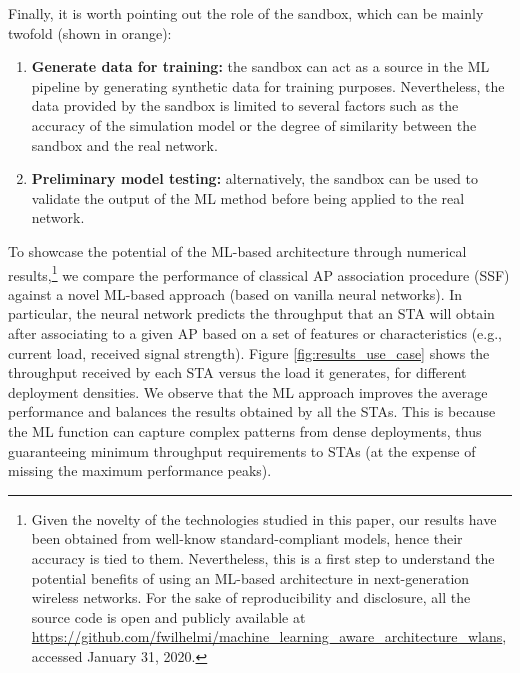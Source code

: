 \documentclass[journal]{IEEEtran}
\begin{document}
Finally, it is worth pointing out the role of the sandbox, which can be mainly twofold (shown in orange):
\begin{enumerate}
	\item \textbf{Generate data for training:} the sandbox can act as a source in the ML pipeline by generating synthetic data for training purposes. Nevertheless, the data provided by the sandbox is limited to several factors such as the accuracy of the simulation model or the degree of similarity between the sandbox and the real network. %
	\item \textbf{Preliminary model testing:} alternatively, the sandbox can be used to validate the output of the ML method before being applied to the real network.
\end{enumerate}

To showcase the potential of the ML-based architecture through numerical results,\footnote{Given the novelty of the technologies studied in this paper, our results have been obtained from well-know standard-compliant models, hence their accuracy is tied to them. Nevertheless, this is a first step to understand the potential benefits of using an ML-based architecture in next-generation wireless networks. For the sake of reproducibility and disclosure, all the source code is open and publicly available at \href{https://github.com/fwilhelmi/machine_learning_aware_architecture_wlans}{https://github.com/fwilhelmi/machine\_learning\_aware\_architecture\_wlans}, accessed January 31, 2020.} we compare the performance of classical AP association procedure (SSF) against a novel ML-based approach (based on vanilla neural networks). In particular, the neural network predicts the throughput that an STA will obtain after associating to a given AP based on a set of features or characteristics (e.g., current load, received signal strength). Figure \ref{fig:results_use_case} shows the throughput received by each STA versus the load it generates, for different deployment densities. We observe that the ML approach improves the average performance and balances the results obtained by all the STAs. This is because the ML function can capture complex patterns from dense deployments, thus guaranteeing minimum throughput requirements to STAs (at the expense of missing the maximum performance peaks).
\end{document}
